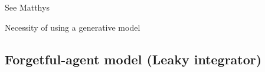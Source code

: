\documentclass[profile,final,english, draft]{article}%
\begin{document}
See Matthys

Necessity of using a generative model


\subsection{Forgetful-agent model (Leaky integrator)}
%
%
%
%
%
\end{document}
